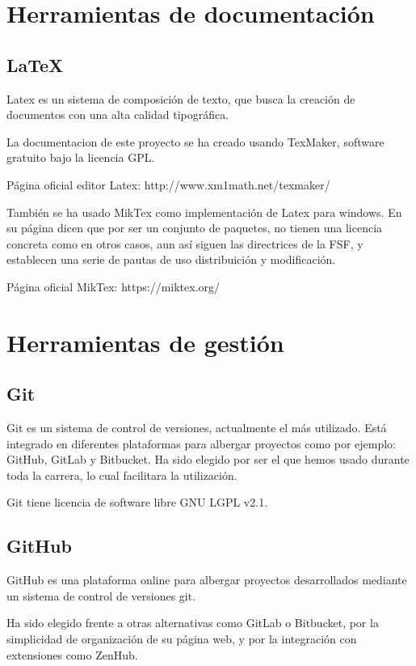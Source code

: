 \section{Herramientas de documentación}

\subsection{LaTeX}

Latex es un sistema de composición de texto, que busca la creación de documentos con una alta calidad tipográfica.

La documentacion de este proyecto se ha creado usando TexMaker, software gratuito bajo la licencia GPL.

Página oficial editor Latex: http://www.xm1math.net/texmaker/

También se ha usado MikTex como implementación de Latex para windows. En su página dicen que por ser un conjunto de paquetes, no tienen una licencia concreta como en otros casos, aun así siguen las directrices de la FSF, y establecen una serie de pautas de uso distribuición y modificación.

Página oficial MikTex: https://miktex.org/

\section{Herramientas de gestión}

\subsection{Git}
Git es un sistema de control de versiones, actualmente el más utilizado. Está integrado en diferentes plataformas para albergar proyectos como por ejemplo: GitHub, GitLab y Bitbucket.
Ha sido elegido por ser el que hemos usado durante toda la carrera, lo cual facilitara la utilización.

Git tiene licencia de software libre GNU LGPL v2.1.

\subsection{GitHub}
GitHub es una plataforma online para albergar proyectos desarrollados mediante un sistema de control de versiones git. 

Ha sido elegido frente a otras alternativas como GitLab o Bitbucket, por la simplicidad de organización de su página web, y por la integración con extensiones como ZenHub.

